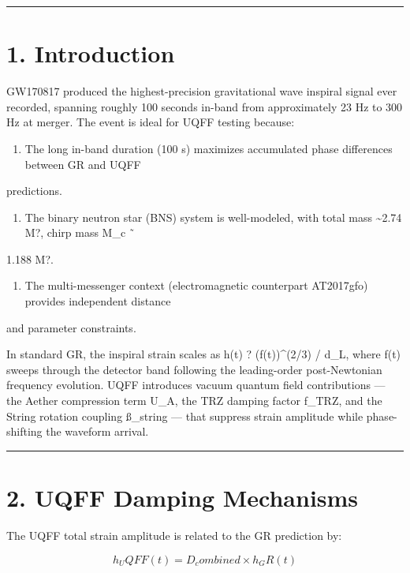 \documentclass[11pt]{article}
\begin{document}
\noindent\rule{\textwidth}{0.4pt}

\section*{1. Introduction}

GW170817 produced the highest-precision gravitational wave inspiral signal ever recorded, spanning roughly 100 seconds in-band from approximately 23 Hz to 300 Hz at merger. The event is ideal for UQFF testing because:

\begin{enumerate}
  \item The long in-band duration (100 s) maximizes accumulated phase differences between GR and UQFF
\end{enumerate}

predictions.

\begin{enumerate}
  \item The binary neutron star (BNS) system is well-modeled, with total mass \textasciitilde{}2.74 M?, chirp mass M\_c ˜
\end{enumerate}

1.188 M?.

\begin{enumerate}
  \item The multi-messenger context (electromagnetic counterpart AT2017gfo) provides independent distance
\end{enumerate}

and parameter constraints.

In standard GR, the inspiral strain scales as h(t) ? (f(t))\textasciicircum{}(2/3) / d\_L, where f(t) sweeps through the detector band following the leading-order post-Newtonian frequency evolution. UQFF introduces vacuum quantum field contributions --- the Aether compression term U\_A, the TRZ damping factor f\_TRZ, and the String rotation coupling ß\_string --- that suppress strain amplitude while phase-shifting the waveform arrival.

\noindent\rule{\textwidth}{0.4pt}

\section*{2. UQFF Damping Mechanisms}

The UQFF total strain amplitude is related to the GR prediction by:

$$
h_UQFF(t) = D_combined \times h_GR(t)
$$
\end{document}
